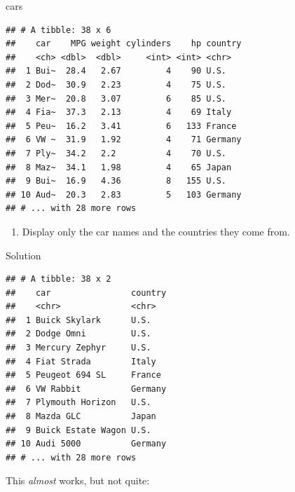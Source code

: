 \documentclass[]{tufte-book}
\newenvironment{Shaded}{}{}
\newcommand{\KeywordTok}[1]{\textcolor[rgb]{0.00,0.44,0.13}{\textbf{#1}}}
\newcommand{\NormalTok}[1]{#1}
\newcommand{\OperatorTok}[1]{\textcolor[rgb]{0.40,0.40,0.40}{#1}}
\newcommand{\StringTok}[1]{\textcolor[rgb]{0.25,0.44,0.63}{#1}}
\providecommand{\tightlist}{%
  \setlength{\itemsep}{0pt}\setlength{\parskip}{0pt}}
\theoremstyle{definition}
\theoremstyle{definition}
\theoremstyle{definition}
\theoremstyle{remark}
\begin{document}
\begin{Shaded}
\begin{Highlighting}[]
\NormalTok{cars}
\end{Highlighting}
\end{Shaded}

\begin{verbatim}
## # A tibble: 38 x 6
##    car    MPG weight cylinders    hp country
##    <ch> <dbl>  <dbl>     <int> <int> <chr>  
##  1 Bui~  28.4   2.67         4    90 U.S.   
##  2 Dod~  30.9   2.23         4    75 U.S.   
##  3 Mer~  20.8   3.07         6    85 U.S.   
##  4 Fia~  37.3   2.13         4    69 Italy  
##  5 Peu~  16.2   3.41         6   133 France 
##  6 VW ~  31.9   1.92         4    71 Germany
##  7 Ply~  34.2   2.2          4    70 U.S.   
##  8 Maz~  34.1   1.98         4    65 Japan  
##  9 Bui~  16.9   4.36         8   155 U.S.   
## 10 Aud~  20.3   2.83         5   103 Germany
## # ... with 28 more rows
\end{verbatim}

\begin{enumerate}
\def\labelenumi{(\alph{enumi})}
\setcounter{enumi}{1}
\tightlist
\item
  Display only the car names and the countries they come from.
\end{enumerate}

Solution

\begin{Shaded}
\end{Shaded}

\begin{verbatim}
## # A tibble: 38 x 2
##    car                country
##    <chr>              <chr>  
##  1 Buick Skylark      U.S.   
##  2 Dodge Omni         U.S.   
##  3 Mercury Zephyr     U.S.   
##  4 Fiat Strada        Italy  
##  5 Peugeot 694 SL     France 
##  6 VW Rabbit          Germany
##  7 Plymouth Horizon   U.S.   
##  8 Mazda GLC          Japan  
##  9 Buick Estate Wagon U.S.   
## 10 Audi 5000          Germany
## # ... with 28 more rows
\end{verbatim}

This \emph{almost} works, but not quite:

\begin{Shaded}
\end{Shaded}
\end{document}
